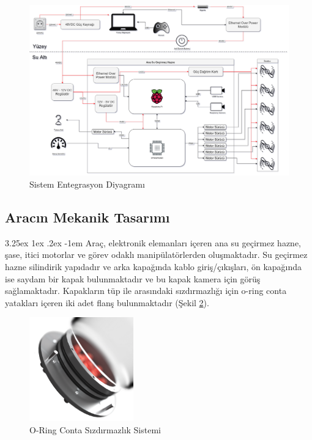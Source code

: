 \documentclass[12pt]{article}
\makeatletter
\renewcommand\paragraph{\@startsection{paragraph}{5}{\z@}%
  {3.25ex \@plus1ex \@minus.2ex}%
  {-1em}%
  {\normalfont\normalsize\bfseries}}
\makeatother
\begin{document}
\newpage

\begin{figure}[hbt!]
\centering
\includegraphics[width=1\textwidth]{SID.png}
\caption{Sistem Entegrasyon Diyagramı}
\label{fig:SID}
\end{figure}

\subsection{Aracın Mekanik Tasarımı}
\paragraph{} Araç, elektronik elemanları içeren ana su geçirmez hazne, şase, itici motorlar ve görev odaklı manipülatörlerden oluşmaktadır. Su geçirmez hazne silindirik yapıdadır ve arka kapağında kablo giriş/çıkışları, ön kapağında ise saydam bir kapak bulunmaktadır ve bu kapak kamera için görüş sağlamaktadır. Kapakların tüp ile arasındaki sızdırmazlığı için o-ring conta yatakları içeren iki adet flanş bulunmaktadır (Şekil \ref{fig:oring}). 

\begin{figure}[hbt!]
\centering
\includegraphics[width=0.4\textwidth]{oring.png}
\caption{O-Ring Conta Sızdırmazlık Sistemi}
\label{fig:oring}
\end{figure}
\end{document}
